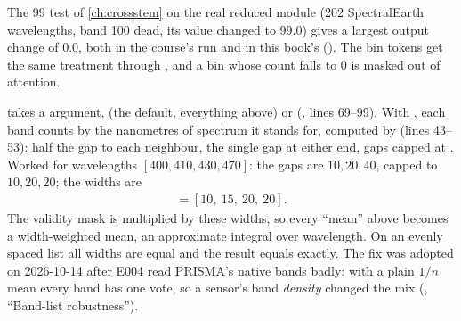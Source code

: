 The 99 test of \cref{ch:crossstem} on the real reduced module (202 SpectralEarth wavelengths, band 100 dead, its value changed to 99.0) gives a largest output change of 0.0, both in the course's run and in this book's ()\tagC. The bin tokens get the same treatment through , and a bin whose count falls to 0 is masked out of attention.

\begin{sourcenote}[: \texttt{band\_weighting = "width"}, a later fix the course does not show]
 takes a  argument,  (the default, everything above) or  (, lines 69--99). With , each band counts by the nanometres of spectrum it stands for, computed by  (lines 43--53): half the gap to each neighbour, the single gap at either end, gaps capped at . Worked for wavelengths $[400, 410, 430, 470]$: the gaps are $10, 20, 40$, capped to $10, 20, 20$; the widths are
\begin{align*}
  [10,\ (10 + 20)/2,\ (20 + 20)/2,\ 20] = [10,\ 15,\ 20,\ 20].
\end{align*}
The validity mask is multiplied by these widths, so every ``mean'' above becomes a width-weighted mean, an approximate integral over wavelength. On an evenly spaced list all widths are equal and the result equals  exactly. The fix was adopted on 2026-10-14 after E004 read PRISMA's native bands badly: with a plain $1/n$ mean every band has one vote, so a sensor's band \emph{density} changed the mix (, ``Band-list robustness'').
\end{sourcenote}


